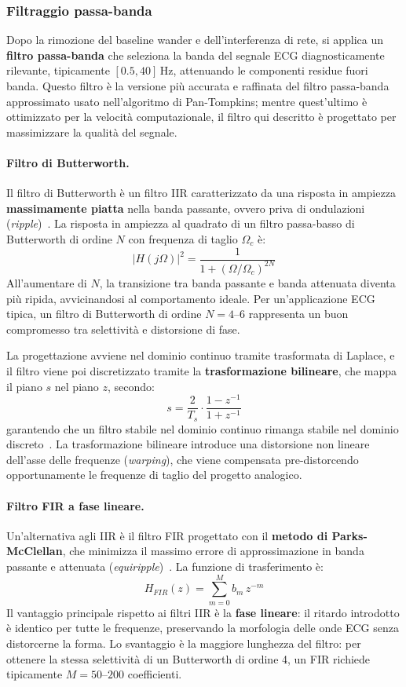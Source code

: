 \subsubsection{Filtraggio passa-banda}
Dopo la rimozione del baseline wander e dell'interferenza di rete, si applica un \textbf{filtro passa-banda} che seleziona la banda del segnale ECG diagnosticamente rilevante, tipicamente $[0.5, 40]\,\text{Hz}$, attenuando le componenti residue fuori banda. Questo filtro è la versione più accurata e raffinata del filtro passa-banda approssimato usato nell'algoritmo di Pan-Tompkins; mentre quest'ultimo è ottimizzato per la velocità computazionale, il filtro qui descritto è progettato per massimizzare la qualità del segnale.

\paragraph{Filtro di Butterworth.}
Il filtro di Butterworth è un filtro IIR caratterizzato da una risposta in ampiezza \textbf{massimamente piatta} nella banda passante, ovvero priva di ondulazioni (\textit{ripple})~\cite{butterworth1930}. La risposta in ampiezza al quadrato di un filtro passa-basso di Butterworth di ordine $N$ con frequenza di taglio $\Omega_c$ è:
\[
|H(j\Omega)|^2 = \frac{1}{1 + \left(\Omega/\Omega_c\right)^{2N}}
\]
All'aumentare di $N$, la transizione tra banda passante e banda attenuata diventa più ripida, avvicinandosi al comportamento ideale. Per un'applicazione ECG tipica, un filtro di Butterworth di ordine $N = 4$--$6$ rappresenta un buon compromesso tra selettività e distorsione di fase.

La progettazione avviene nel dominio continuo tramite trasformata di Laplace, e il filtro viene poi discretizzato tramite la \textbf{trasformazione bilineare}, che mappa il piano $s$ nel piano $z$, secondo:
\[
s = \frac{2}{T_s} \cdot \frac{1 - z^{-1}}{1 + z^{-1}}
\]
garantendo che un filtro stabile nel dominio continuo rimanga stabile nel dominio discreto~\cite{oppenheim1997dsp}. La trasformazione bilineare introduce una distorsione non lineare dell'asse delle frequenze (\textit{warping}), che viene compensata pre-distorcendo opportunamente le frequenze di taglio del progetto analogico.

\paragraph{Filtro FIR a fase lineare.}
Un'alternativa agli IIR è il filtro FIR progettato con il \textbf{metodo di Parks-McClellan}, che minimizza il massimo errore di approssimazione in banda passante e attenuata (\textit{equiripple})~\cite{parks1972chebyshev}. La funzione di trasferimento è:
\[
H_{FIR}(z) = \sum_{m=0}^{M} b_m\, z^{-m}
\]
Il vantaggio principale rispetto ai filtri IIR è la \textbf{fase lineare}: il ritardo introdotto è identico per tutte le frequenze, preservando la morfologia delle onde ECG senza distorcerne la forma. Lo svantaggio è la maggiore lunghezza del filtro: per ottenere la stessa selettività di un Butterworth di ordine 4, un FIR richiede tipicamente $M = 50$--$200$ coefficienti.

